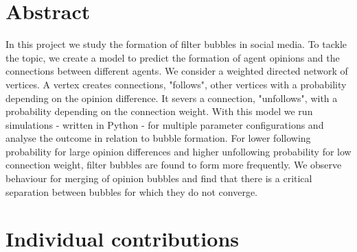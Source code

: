 \documentclass[11pt]{article}
\begin{document}

\newpage





\newpage




\tableofcontents

\newpage




\section{Abstract}

In this project we study the formation of filter bubbles in social media. To tackle the topic, we create a model to predict the formation of agent opinions and the connections between different agents. We consider a weighted directed network of vertices. A vertex creates connections, "follows", other vertices with a probability depending on the opinion difference. It severs a connection, "unfollows", with a probability depending on the connection weight. With this model we run simulations - written in Python - for multiple parameter configurations and analyse the outcome in relation to bubble formation. For lower following probability for large opinion differences and higher unfollowing probability for low connection weight, filter bubbles are found to form more frequently. We observe behaviour for merging of opinion bubbles and find that there is a critical separation between bubbles for which they do not converge.

\section{Individual contributions}
\end{document}
